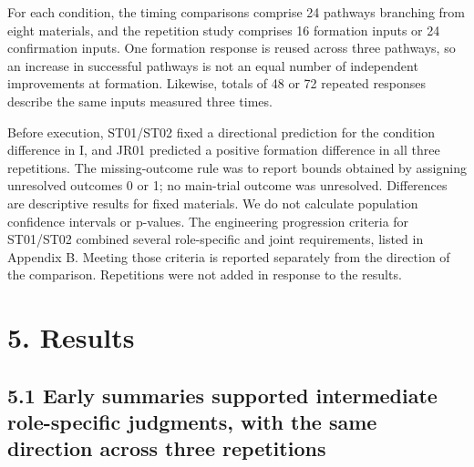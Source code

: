 \documentclass[10pt,a4paper]{article}
\begin{document}
For each condition, the timing comparisons comprise 24 pathways branching from eight materials, and the repetition study comprises 16 formation inputs or 24 confirmation inputs. One formation response is reused across three pathways, so an increase in successful pathways is not an equal number of independent improvements at formation. Likewise, totals of 48 or 72 repeated responses describe the same inputs measured three times.

Before execution, ST01/ST02 fixed a directional prediction for the condition difference in I, and JR01 predicted a positive formation difference in all three repetitions. The missing-outcome rule was to report bounds obtained by assigning unresolved outcomes 0 or 1; no main-trial outcome was unresolved. Differences are descriptive results for fixed materials. We do not calculate population confidence intervals or p-values. The engineering progression criteria for ST01/ST02 combined several role-specific and joint requirements, listed in Appendix B. Meeting those criteria is reported separately from the direction of the comparison. Repetitions were not added in response to the results.

\section{5. Results}\label{paper-03-results}

\subsection{5.1 Early summaries supported intermediate role-specific judgments, with the same direction across three repetitions}\label{paper-03-early-summaries-supported-intermediate-role-specific-judgments-with-the-same-direction-across-three-repetitions}
\end{document}
